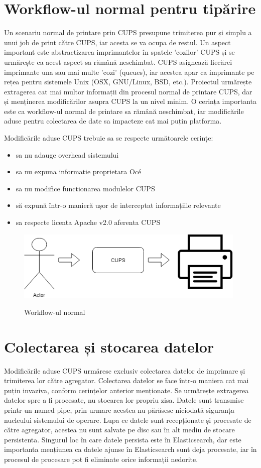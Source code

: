 \documentclass[12pt]{report}
\begin{document}
	\section{Workflow-ul normal pentru tipărire}
Un scenariu normal de printare prin CUPS presupune trimiterea pur și simplu a unui job de print către CUPS, iar acesta se va ocupa de restul. Un aspect important este abstractizarea imprimantelor în spatele 'cozilor' CUPS și se urmărește ca acest aspect sa rămână neschimbat. CUPS asignează fiecărei imprimante una sau mai multe 'cozi' (queues), iar acestea apar ca imprimante pe rețea pentru sistemele Unix (OSX, GNU/Linux, BSD, etc.).
Proiectul urmărește extragerea cat mai multor informații din procesul normal de printare CUPS, dar și menținerea modificărilor asupra CUPS la un nivel minim. O cerința importanta este ca workflow-ul normal de printare sa rămână neschimbat, iar modificările aduse pentru colectarea de date sa impacteze cat mai puțin platforma.

Modificările aduse CUPS trebuie sa se respecte următoarele cerințe:
\begin{itemize}
\item sa nu adauge overhead sistemului
\item sa nu expuna informatie proprietara Océ
\item sa nu modifice functionarea modulelor CUPS
\item să expună într-o manieră ușor de interceptat informațiile relevante
\item sa respecte licenta Apache v2.0 aferenta CUPS
\end{itemize}


\begin{figure}[h]
		\centering
			{\includegraphics[width=110mm]{workflow.png}}
		\caption{Workflow-ul normal}
\end{figure}

	\section{Colectarea și stocarea datelor}
Modificările aduse CUPS urmăresc exclusiv colectarea datelor de imprimare și trimiterea lor către agregator. Colectarea datelor se face într-o maniera cat mai puțin invaziva, conform cerințelor anterior menționate. Se urmărește extragerea datelor spre a fi procesate, nu stocarea lor propriu zisa. Datele sunt transmise printr-un named pipe, prin urmare acestea nu părăsesc niciodată siguranța nucleului sistemului de operare. Lupa ce datele sunt recepționate și procesate de către agregator, acestea nu sunt salvate pe disc sau în alt mediu de stocare persistenta. Singurul loc în care datele persista este în Elasticsearch, dar este importanta mențiunea ca datele ajunse în Elasticsearch sunt deja procesate, iar în procesul de procesare pot fi eliminate orice informații nedorite.
\end{document}
